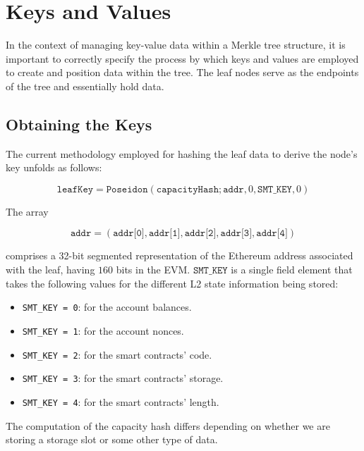 



\section{Keys and Values}

In the context of managing key-value data within a Merkle tree structure, it is important to correctly specify the process by which keys and values are employed to create and position data within the tree. The leaf nodes serve as the endpoints of the tree and essentially hold data.

\subsection{Obtaining the Keys}

The current methodology employed for hashing the leaf data to derive the node's key unfolds as follows:

$$ \texttt{leafKey} = \texttt{Poseidon}(\texttt{capacityHash}; \texttt{addr}, 0, \texttt{SMT\_KEY}, 0) $$

The array

$$ \texttt{addr} = (\texttt{addr[0]}, \texttt{addr[1]}, \texttt{addr[2]}, \texttt{addr[3]}, \texttt{addr[4]}) $$

comprises a 32-bit segmented representation of the Ethereum address associated with the leaf, having $160$ bits in the EVM. $\texttt{SMT\_KEY}$ is a single field element that takes the following values for the different L2
state information being stored:

\begin{itemize}
\item \texttt{SMT\_KEY = 0}: for the account balances.
\item \texttt{SMT\_KEY = 1}: for the account nonces.
\item \texttt{SMT\_KEY = 2}: for the smart contracts' code.
\item \texttt{SMT\_KEY = 3}: for the smart contracts' storage.
\item \texttt{SMT\_KEY = 4}: for the smart contracts' length.
\end{itemize}

The computation of the capacity hash differs depending on whether we are storing a storage slot or some other type of data.

